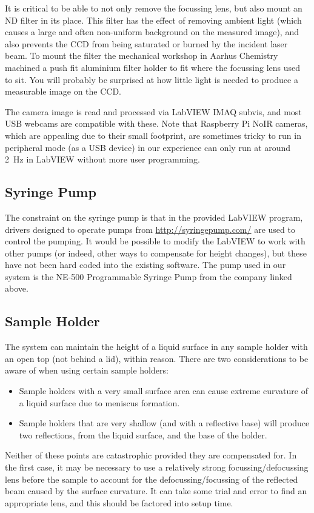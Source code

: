 \documentclass[11pt,a4paper,twoside]{article}
\begin{document}
It is critical to be able to not only remove the focussing lens, but also mount an ND filter in its place. This filter has the effect of removing ambient light (which causes a large and often non-uniform background on the measured image), and also prevents the CCD from being saturated or burned by the incident laser beam. To mount the filter the mechanical workshop in Aarhus Chemistry machined a push fit aluminium filter holder to fit where the focussing lens used to sit. You will probably be surprised at how little light is needed to produce a measurable image on the CCD. 

The camera image is read and processed via LabVIEW IMAQ subvis, and most USB webcams are compatible with these. Note that Raspberry Pi NoIR cameras, which are appealing due to their small footprint, are sometimes tricky to run in peripheral mode (as a USB device) in our experience can only run at around \SI{2}{\hertz} in LabVIEW without more user programming.


\subsection{Syringe Pump}
The constraint on the syringe pump is that in the provided LabVIEW program, drivers designed to operate pumps from \url{http://syringepump.com/} are used to control the pumping. It would be possible to modify the LabVIEW to work with other pumps (or indeed, other ways to compensate for height changes), but these have not been hard coded into the existing software. The pump used in our system is the NE-500 Programmable Syringe Pump from the company linked above.

\subsection{Sample Holder}
The system can maintain the height of a liquid surface in any sample holder with an open top (not behind a lid), within reason. There are two considerations to be aware of when using certain sample holders:
\begin{itemize}
\item Sample holders with a very small surface area can cause extreme curvature of a liquid surface due to meniscus formation.
\item Sample holders that are very shallow (and with a reflective base) will produce two reflections, from the liquid surface, and the base of the holder.
\end{itemize}
Neither of these points are catastrophic provided they are compensated for. In the first case, it may be necessary to use a relatively strong focussing/defocussing lens before the sample to account for the defocussing/focussing of the reflected beam caused by the surface curvature. It can take some trial and error to find an appropriate lens, and this should be factored into setup time. 
\end{document}
